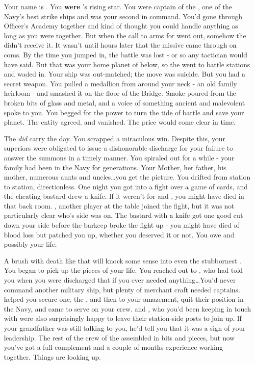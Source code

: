 \documentclass[char]{TMFHope}
\begin{document}
\name{\cCap{}}

Your name is \cCap{}. You {\bf were} \pTMN{}'s rising star. You were captain of the \pOld{}, one of the Navy's best strike ships and \cXO{} was your second in command. You'd gone through Officer's Academy together and kind of thought you could handle anything as long as you were together. But when the call to arms for went out, somehow the \pOld{} didn't receive it. It wasn't until hours later that the  missive came through on coms. By the time you jumped in, the battle was lost - or so any tactician would have said. But that was your home planet of \pHome{} below, so the \pOld{} went to battle stations and waded in. Your ship was out-matched; the move was suicide. But you had a secret weapon. You pulled a medallion from around your neck - an old family heirloom - and smashed it on the floor of the Bridge. Smoke poured from the broken bits of glass and metal, and a voice of something ancient and malevolent spoke to you. You begged for the power to turn the tide of battle and save your planet. The entity agreed, and vanished. The price would come clear in time.

The \pOld{} \emph{did} carry the day. You scrapped a miraculous win. Despite this, your superiors were obligated to issue a dishonorable discharge for your failure to answer the summons in a timely manner. You spiraled out for a while - your family had been in the Navy for generations. Your Mother, her father, his mother, numerous aunts and uncles\ldots you get the picture. You drifted from station to station, directionless. One night you got into a fight over a game of cards, and the cheating bastard drew a knife. If it weren't for \cSci{} and \cMed{}, you might have died in that back room. \cSci{}, another player at the table joined the fight, but it was not particularly clear who's side \cSci{\They} was on. The bastard with a knife got one good cut down your side before the barkeep broke the fight up - you might have died of blood loss but \cMed{} patched you up, whether you deserved it or not. You owe \cMed{} and possibly \cSci{} your life.

A brush with death like that will knock some sense into even the stubbornest \cCap{\human}. You began to pick up the pieces of your life. You reached out to \cXO{}, who had told you when you were discharged that if you ever needed anything\ldots You'd never command another military ship, but plenty of merchant craft needed captains. \cXO{} helped you secure one, the \pNew{}, and then to your amazement, quit their position in the Navy, and came to serve on your crew. \cMed{} and \cSci{}, who you'd been keeping in touch with were also surprisingly happy to leave their station-side posts to join up. If your grandfather was still talking to you, he'd tell you that it was a sign of your leadership. The rest of the crew of the \pNew{} assembled in bits and pieces, but now you've got a full complement and a couple of months experience working together. Things are looking up.
\end{document}
